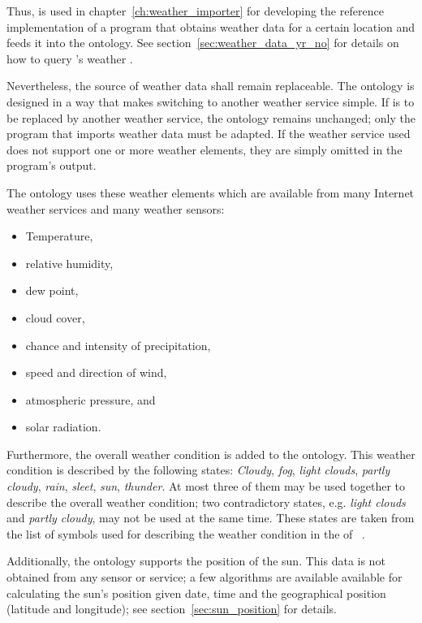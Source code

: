Thus, \yrno is used in chapter~\ref{ch:weather_importer} for developing the reference implementation of a program that obtains weather data for a certain location and feeds it into the \thinkhomeweather ontology. See section~\ref{sec:weather_data_yr_no} for details on how to query \yrno's weather .

Nevertheless, the source of weather data shall remain replaceable. The ontology is designed in a way that makes switching to another weather service simple. If \yrno is to be replaced by another weather service, the ontology remains unchanged; only the program that imports weather data must be adapted. If the weather service used does not support one or more weather elements, they are simply omitted in the program's output.

The ontology uses these weather elements which are available from many Internet weather services and many weather sensors:
\begin{itemize}
  \item Temperature,
  \item relative humidity,
  \item dew point,
  \item cloud cover,
  \item chance and intensity of precipitation,
  \item speed and direction of wind,
  \item atmospheric pressure, and
  \item solar radiation.
\end{itemize}

Furthermore, the overall weather condition is added to the ontology. This weather condition is described by the following states: \emph{Cloudy}, \emph{fog}, \emph{light clouds}, \emph{partly cloudy}, \emph{rain}, \emph{sleet}, \emph{sun}, \emph{thunder}. At most three of them may be used together to describe the overall weather condition; two contradictory states, e.g. \emph{light clouds} and \emph{partly cloudy}, may not be used at the same time. These states are taken from the list of symbols used for describing the weather condition in the  of \yrno~\cite{yrno_faq}.

Additionally, the ontology supports the position of the sun. This data is not obtained from any sensor or service; a few algorithms are available available for calculating the sun's position given date, time and the geographical position (latitude and longitude); see section~\ref{sec:sun_position} for details.

